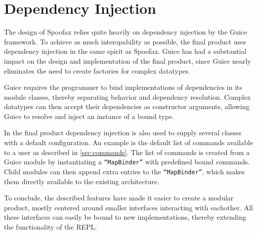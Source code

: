 \section{Dependency Injection}
\label{sec:injection}

The design of Spoofax relies quite heavily on dependency injection by the Guice
framework.  To achieve as much interopability as possible, the final product
uses dependency injection in the same spirit as Spoofax. Guice has had a
substantial impact on the design and implementation of the final product, since
Guice nearly eliminates the need to create factories for complex datatypes.

Guice requires the programmer to bind implementations of dependencies in its
module classes, thereby separating behavior and dependency resolution.  Complex
datatypes can then accept their dependencies as constructor arguments, allowing
Guice to resolve and inject an instance of a bound type.

In the final product dependency injection is also used to supply several classes
with a default configuration.  An example is the default list of commands
available to a user as described in \cref{sec:commands}.  The list of commands
is created from a Guice module by instantiating a \texttt{``MapBinder''} with
predefined bound commands. Child modules can then append extra entries to the
\texttt{``MapBinder''}, which makes them directly available to the existing
architecture.

To conclude, the described features have made it easier to create a modular
product, mostly centered around smaller interfaces interacting with eachother.
All these interfaces can easily be bound to new implementations, thereby
extending the functionality of the REPL.
